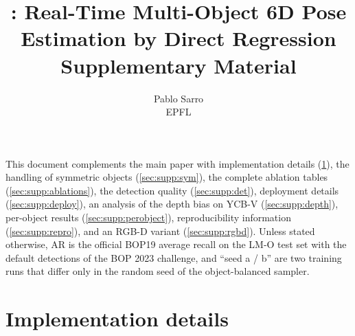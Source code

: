 

\renewcommand{\thesection}{S\arabic{section}}
\renewcommand{\thetable}{S\arabic{table}}
\renewcommand{\thefigure}{S\arabic{figure}}
\renewcommand{\theequation}{S\arabic{equation}}

\title{\ours: Real-Time Multi-Object 6D Pose Estimation by Direct Regression\\
\large Supplementary Material}
\author{Pablo Sarro\\ EPFL}


\maketitle

This document complements the main paper with implementation details (\cref{sec:supp:impl}),
the handling of symmetric objects (\cref{sec:supp:sym}), the complete ablation tables
(\cref{sec:supp:ablations}), the detection quality (\cref{sec:supp:det}), deployment details
(\cref{sec:supp:deploy}), an analysis of the depth bias on YCB-V (\cref{sec:supp:depth}),
per-object results (\cref{sec:supp:perobject}), reproducibility information
(\cref{sec:supp:repro}), and an RGB-D variant (\cref{sec:supp:rgbd}). Unless stated otherwise, AR is the official BOP19 average recall on the
LM-O test set with the default detections of the BOP 2023 challenge, and ``seed a / b'' are two
training runs that differ only in the random seed of the object-balanced sampler.

\section{Implementation details}
\label{sec:supp:impl}

